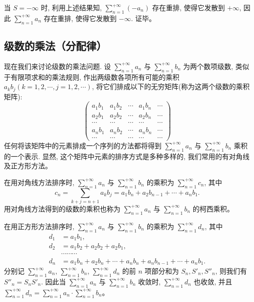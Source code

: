 \documentclass[UTF8, 12pt, fontset=fandol, oneside]{ctexart}
\begin{document}
当 $S=-\infty$ 时, 利用上述结果知, $\sum\limits_{n=1}^{+\infty}(-a_n)$ 存在重排, 使得它发散到 $+\infty$, 因此 $\sum\limits_{n=1}^{+\infty}a_n$ 存在重排, 使得它发散到 $-\infty$. 证毕。

\subsection{级数的乘法（分配律）}

现在我们来讨论级数的乘法问题. 设 $\sum\limits_{n=1}^{+\infty}a_n$ 与 $\sum\limits_{n=1}^{+\infty}b_n$ 为两个数项级数, 类似于有限项求和的乘法规则, 作出两级数各项所有可能的乘积 $a_kb_j(k=1,2,\cdots,j=1,2,\cdots)$, 将它们排成以下的无穷矩阵(称为这两个级数的乘积矩阵):
\[
  \begin{pmatrix}
    a_1b_1 & a_1b_2 & \cdots & a_1b_n & \cdots\\
    a_2b_1 & a_2b_2 & \cdots & a_2b_n & \cdots\\
    \cdots & \cdots & \cdots & \cdots & \cdots\\
    a_nb_1 & a_nb_2 & \cdots & a_nb_n & \cdots\\
    \cdots & \cdots & \cdots & \cdots & \cdots
  \end{pmatrix}
\]
任何将该矩阵中的元素排成一个序列的方法都将得到 $\sum\limits_{n=1}^{+\infty}a_n$ 与 $\sum\limits_{n=1}^{+\infty}b_n$ 乘积的一个表示. 显然, 这个矩阵中元素的排序方式是多种多样的, 我们常用的有对角线及正方形方法。

在用对角线方法排序时, $\sum\limits_{n=1}^{+\infty}a_n$ 与 $\sum\limits_{n=1}^{+\infty}b_n$ 的乘积为 $\sum\limits_{n=1}^{+\infty}c_n$, 其中
\[
  c_n=\sum_{k+j=n+1}a_kb_j=a_1b_n+a_2b_{n-1}+\cdots+a_nb_1.
\]
用对角线方法得到的级数的乘积也称为 $\sum\limits_{n=1}^{+\infty}a_n$ 与 $\sum\limits_{n=1}^{+\infty}b_n$ 的柯西乘积。

在用正方形方法排序时, $\sum\limits_{n=1}^{+\infty}a_n$ 与 $\sum\limits_{n=1}^{+\infty}b_n$ 的乘积为 $\sum\limits_{n=1}^{+\infty}d_n$, 其中
\[
\begin{aligned}
  d_1&=a_1b_1,\\
  d_2&=a_1b_2+a_2b_2+a_2b_1,\\
  &\cdots\cdots\cdots\\
  d_n&=a_1b_n+a_2b_n+\cdots+a_nb_n+a_nb_{n-1}+\cdots+a_nb_1.
\end{aligned}
\]
分别记 $\sum\limits_{n=1}^{+\infty}a_n$, $\sum\limits_{n=1}^{+\infty}b_n$, $\sum\limits_{n=1}^{+\infty}d_n$ 的前 $n$ 项部分和为 $S_n,S'_n,S''_n$, 则我们有 $S''_n=S_nS'_n$. 因此当 $\sum\limits_{n=1}^{+\infty}a_n$ 与 $\sum\limits_{n=1}^{+\infty}b_n$ 收敛时, $\sum\limits_{n=1}^{+\infty}d_n$ 也收敛, 并且 $\sum\limits_{n=1}^{+\infty}d_n=\sum\limits_{n=1}^{+\infty}a_n\cdot\sum\limits_{n=1}^{+\infty}b_n$。
\end{document}
